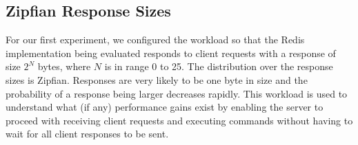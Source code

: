 \documentclass[sigconf, screen]{acmart}
\begin{document}
\subsection{Zipfian Response Sizes}
For our first experiment, we configured the workload so that
the Redis implementation being evaluated responds to client requests with a response of size $2^N$ bytes, where $N$ is in range 0 to 25.
The distribution over the response sizes is Zipfian.
Responses are very likely to be one byte in size and the probability of a response being larger decreases rapidly.
This workload is used to understand what (if any) performance gains exist by enabling the server to proceed with receiving client requests and executing commands without having to wait for all client responses to be sent.
\end{document}
